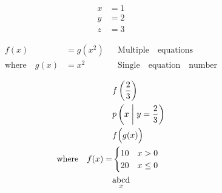 \documentclass{article}
\begin{document}
\begin{align}
    x &= 1 \\
    y &= 2 \\
    z &= 3 \nonumber
\end{align}

\begin{equation}
\begin{aligned}
    f(x) &= g(x^2) && \mathrm{Multiple \quad equations} \\
    \mathrm{where} \quad g(x) &= x^2 &&\mathrm{Single \quad equation \quad number}
\end{aligned}
\end{equation}

\begin{align*}
    &f \left( \frac 2 3 \right) \\
    &p \left( x \;\middle\vert\; y = \frac 2 3 \right) \\
    &f \Bigl( g(x) \Bigr) \\
    \mathrm{where} \quad f(x) = &\begin{cases}
        10 & x > 0 \\
        20 & x \le 0
    \end{cases} \\
    &\underset{x}{\mathrm{abcd}} \\
\end{align*}
\end{document}
